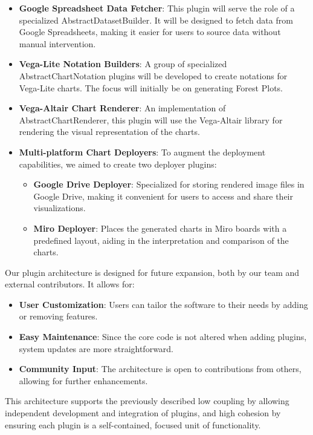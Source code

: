 \begin{itemize}
\item
  \textbf{Google Spreadsheet Data Fetcher}: This plugin will serve the
  role of a specialized AbstractDatasetBuilder. It will be designed to
  fetch data from Google Spreadsheets, making it easier for users to
  source data without manual intervention.
\item
  \textbf{Vega-Lite Notation Builders}: A group of specialized
  AbstractChartNotation plugins will be developed to create notations
  for Vega-Lite charts. The focus will initially be on generating Forest
  Plots.
\item
  \textbf{Vega-Altair Chart Renderer}: An implementation of
  AbstractChartRenderer, this plugin will use the Vega-Altair library
  for rendering the visual representation of the charts.
\item
  \textbf{Multi-platform Chart Deployers}: To augment the deployment
  capabilities, we aimed to create two deployer plugins:

  \begin{itemize}
  \item
    \textbf{Google Drive Deployer}: Specialized for storing rendered
    image files in Google Drive, making it convenient for users to
    access and share their visualizations.
  \item
    \textbf{Miro Deployer}: Places the generated charts in Miro boards
    with a predefined layout, aiding in the interpretation and
    comparison of the charts.
  \end{itemize}
\end{itemize}

Our plugin architecture is designed for future expansion, both by our
team and external contributors. It allows for:

\begin{itemize}
\item
  \textbf{User Customization}: Users can tailor the software to their
  needs by adding or removing features.
\item
  \textbf{Easy Maintenance}: Since the core code is not altered when
  adding plugins, system updates are more straightforward.
\item
  \textbf{Community Input}: The architecture is open to contributions
  from others, allowing for further enhancements.
\end{itemize}

This architecture supports the previously described low coupling by
allowing independent development and integration of plugins, and high
cohesion by ensuring each plugin is a self-contained, focused unit of
functionality.
